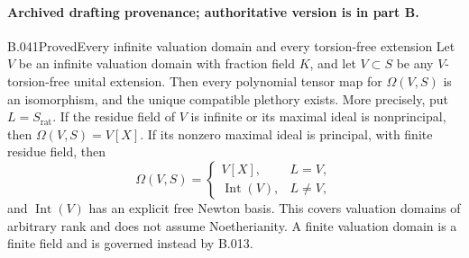 \paragraph*{Archived drafting provenance; authoritative version is in part B.}
\begin{saresult}{B.041}{Proved}{Every infinite valuation domain and every torsion-free extension}
Let $V$ be an infinite valuation domain with fraction field $K$,
and let $V\subset S$ be any $V$-torsion-free unital extension.
Then every polynomial tensor map for $\Omega(V,S)$ is an
isomorphism, and the unique compatible plethory exists.
More precisely, put $L=S_{\mathrm{rat}}$. If the residue field
of $V$ is infinite or its maximal ideal is nonprincipal, then
$\Omega(V,S)=V[X]$. If its nonzero maximal ideal is principal,
with finite residue field, then
\[
 \Omega(V,S)=
 \begin{cases}
 V[X],&L=V,\\
 \operatorname{Int}(V),&L\ne V,
 \end{cases}
\]
and $\operatorname{Int}(V)$ has an explicit free Newton basis.
This covers valuation domains of arbitrary rank and does not
assume Noetherianity. A finite valuation domain is a finite field
and is governed instead by B.013.
\end{saresult}
